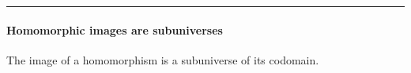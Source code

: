 \begin{code}
\AgdaSpace{}%
\AgdaSymbol{:}\AgdaSpace{}%
\AgdaSymbol{\}\{}\AgdaSpace{}%
\AgdaSymbol{:}\AgdaSpace{}%
\AgdaSpace{}%
\AgdaSpace{}%
\AgdaSymbol{\}(}\AgdaSpace{}%
\AgdaSymbol{:}\AgdaSpace{}%
\AgdaSpace{}%
\AgdaSpace{}%
\AgdaSymbol{)}\AgdaSpace{}%
\AgdaSpace{}%
\AgdaSpace{}%
\AgdaSpace{}%
\AgdaSymbol{\}}\<%
\\
%
\>[1]\<%
\\
%
\\[\AgdaEmptyExtraSkip]%
%
\\[\AgdaEmptyExtraSkip]%
\>[0]\AgdaSpace{}%
\AgdaSpace{}%
\AgdaSymbol{\{}\AgdaSpace{}%
\AgdaSymbol{=}\AgdaSpace{}%
\AgdaSymbol{\}\{}\AgdaSymbol{\}\{}\AgdaSymbol{\}}\AgdaSpace{}%
\<%
\\
\>[0]\<%
\end{code}

\begin{center}\rule{0.5\linewidth}{\linethickness}\end{center}

\paragraph{Homomorphic images are
subuniverses}\label{homomorphic-images-are-subuniverses}

The image of a homomorphism is a subuniverse of its codomain.

